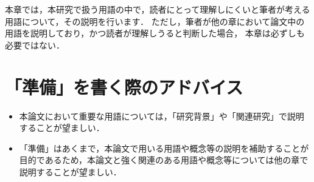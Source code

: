 本章では，本研究で扱う用語の中で，読者にとって理解しにくいと筆者が考える用語について，その説明を行います．
ただし，筆者が他の章において論文中の用語を説明しており，かつ読者が理解しうると判断した場合，
本章は必ずしも必要ではない．

\section{「準備」を書く際のアドバイス}
\begin{itemize}
    \item 本論文において重要な用語については，「研究背景」や「関連研究」で説明することが望ましい．
    \item 「準備」はあくまで，本論文で用いる用語や概念等の説明を補助することが目的であるため，本論文と強く関連のある用語や概念等については他の章で説明することが望ましい．
\end{itemize}
